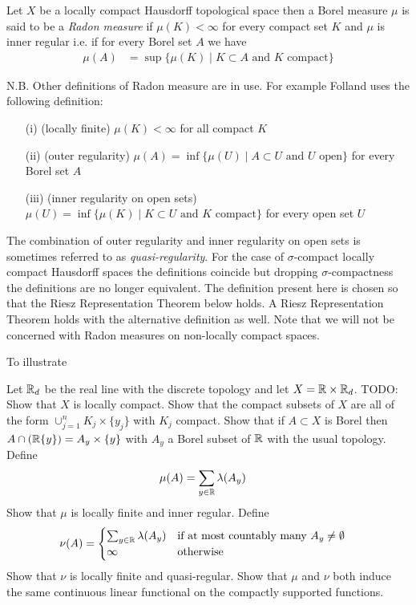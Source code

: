 \begin{defn}Let $X$ be a locally compact Hausdorff topological space then a Borel measure $\mu$ is said to be a
\emph{Radon measure} if $\mu(K) < \infty$ for every compact set $K$ and $\mu$ is inner regular i.e. if for every Borel set $A$ we
have 
\begin{align*}
\mu(A) &= \sup \lbrace \mu(K) \mid K \subset A \text{ and $K$ compact} \rbrace
\end{align*}
\end{defn}

N.B. Other definitions of Radon measure are in use.  For example Folland uses the following definition:
\begin{itemize} 
\item[(i)] (locally finite) $\mu(K)< \infty$ for all compact $K$
\item[(ii)] (outer regularity) $\mu(A) = \inf \lbrace \mu(U) \mid A \subset U \text{ and $U$ open} \rbrace$ for every Borel set $A$
\item[(iii)] (inner regularity on open sets) $\mu(U) = \inf \lbrace \mu(K) \mid K \subset U \text{ and $K$ compact} \rbrace$ for every open set $U$
\end{itemize}
The combination of outer regularity and inner regularity on open sets is sometimes referred to as \emph{quasi-regularity}.
For the case of $\sigma$-compact locally compact Hausdorff spaces the definitions coincide but dropping $\sigma$-compactness the definitions are no longer equivalent.  The definition present here is chosen so that the Riesz Representation Theorem below holds.  A Riesz Representation Theorem holds with the alternative definition as well. Note that we will not be concerned with Radon measures on non-locally compact spaces.

To illustrate 
\begin{examp}Let $\mathbb{R}_d$ be the real line with the discrete topology and let $X = \mathbb{R} \times \mathbb{R}_d$.  TODO: Show that $X$ is locally compact.  Show that the compact subsets of $X$ are all of the form $\cup_{j=1}^n K_j \times \lbrace y_j \rbrace$ with $K_j$ compact.  Show that if $A \subset X$ is Borel then $A \cap (\mathbb{R} \lbrace y \rbrace) = A_y \times \lbrace y \rbrace$ with $A_y$ a Borel subset of $\mathbb{R}$ with the usual topology.  Define 
\begin{align*}
\mu(A) &= \sum_{y \in \mathbb{R}} \lambda(A_y)
\end{align*}
Show that $\mu$ is locally finite and inner regular.  Define 
\begin{align*}
\nu(A) &= \begin{cases}
\sum_{y \in \mathbb{R}} \lambda(A_y) & \text{if at most countably many $A_y \neq \emptyset$} \\
\infty & \text{otherwise}
\end{cases}
\end{align*}
Show that $\nu$ is locally finite and quasi-regular.  Show that $\mu$ and $\nu$ both induce the same continuous linear functional on the compactly supported functions.
\end{examp}

